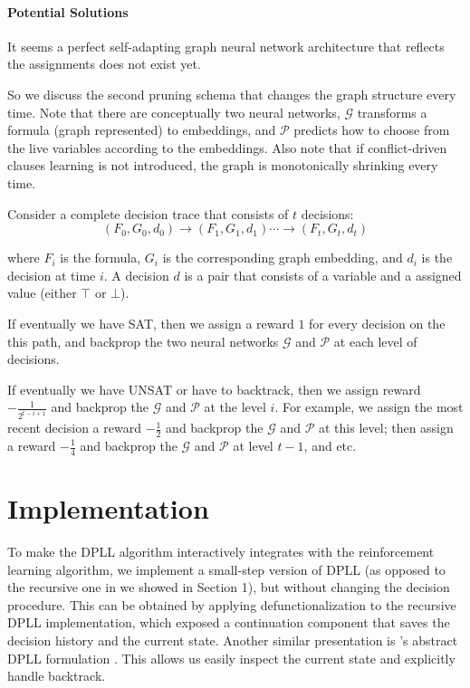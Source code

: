\documentclass[sigplan,10pt]{acmart}\settopmatter{printfolios=true,printccs=false,printacmref=false}
\begin{document}
\paragraph{Potential Solutions}

It seems a perfect self-adapting graph neural network architecture that reflects the assignments
does not exist yet. 

So we discuss the second pruning schema that changes the graph structure every time.
Note that there are conceptually two neural networks, $\mathcal{G}$ transforms a formula (graph represented) 
to embeddings, and $\mathcal{P}$ predicts how to choose from the live variables according to the embeddings.
Also note that if conflict-driven clauses learning is not introduced, 
the graph is monotonically shrinking every time.

Consider a complete decision trace that consists of $t$ decisions:
$$ (F_0, G_0, d_0) \to (F_1, G_1, d_1) \cdots \to (F_t, G_t, d_t) $$

where $F_i$ is the formula, $G_i$ is the corresponding graph embedding, and $d_i$ is the decision at time $i$.
A decision $d$ is a pair that consists of a variable and a assigned value (either $\top$ or $\bot$).

If eventually we have SAT, then we assign a reward $1$ for every decision on the this path,
and backprop the two neural networks $\mathcal{G}$ and $\mathcal{P}$ at each level of decisions.

If eventually we have UNSAT or have to backtrack, then we assign reward $-\frac{1}{2^{t-i+1}}$
and backprop the $\mathcal{G}$ and $\mathcal{P}$ at the level $i$.
For example, we assign the most recent decision a 
reward $-\frac{1}{2}$ and backprop the $\mathcal{G}$ and $\mathcal{P}$ at this level; then assign
a reward $-\frac{1}{4}$ and backprop the $\mathcal{G}$ and $\mathcal{P}$ at level $t-1$, and etc.

\section{Implementation}

To make the DPLL algorithm interactively integrates with the reinforcement learning algorithm, we implement a small-step version of 
DPLL (as opposed to the recursive one in we showed in Section 1), but without changing the decision procedure. This can be obtained by applying 
defunctionalization \cite{DBLP:conf/ppdp/DanvyN01} to the recursive DPLL implementation, which exposed a continuation
component that saves the decision history and the current state. Another similar presentation
is \citeauthor{DBLP:conf/lpar/NieuwenhuisOT04}'s abstract DPLL formulation \cite{DBLP:conf/lpar/NieuwenhuisOT04}.
This allows us easily inspect the current state and explicitly handle backtrack.
\end{document}
